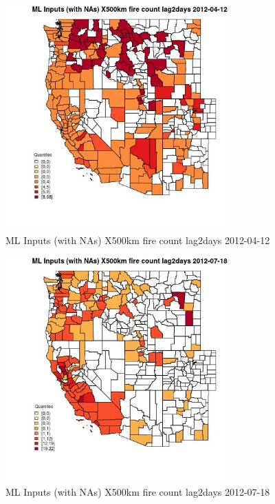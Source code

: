\begin{figure} 
\centering  
\includegraphics[width=0.77\textwidth]{Code_Outputs/Report_ML_input_PM25_Step4_part_e_de_duplicated_aves_compiled_2019-05-14wNAs_CountyX500km_fire_count_lag2daysMean2012-04-12_2012-04-12.jpg} 
\caption{\label{fig:Report_ML_input_PM25_Step4_part_e_de_duplicated_aves_compiled_2019-05-14wNAsCountyX500km_fire_count_lag2daysMean2012-04-12_2012-04-12}ML Inputs (with NAs) X500km fire count lag2days 2012-04-12} 
\end{figure} 
 

\begin{figure} 
\centering  
\includegraphics[width=0.77\textwidth]{Code_Outputs/Report_ML_input_PM25_Step4_part_e_de_duplicated_aves_compiled_2019-05-14wNAs_CountyX500km_fire_count_lag2daysMean2012-07-18_2012-07-18.jpg} 
\caption{\label{fig:Report_ML_input_PM25_Step4_part_e_de_duplicated_aves_compiled_2019-05-14wNAsCountyX500km_fire_count_lag2daysMean2012-07-18_2012-07-18}ML Inputs (with NAs) X500km fire count lag2days 2012-07-18} 
\end{figure} 
 

